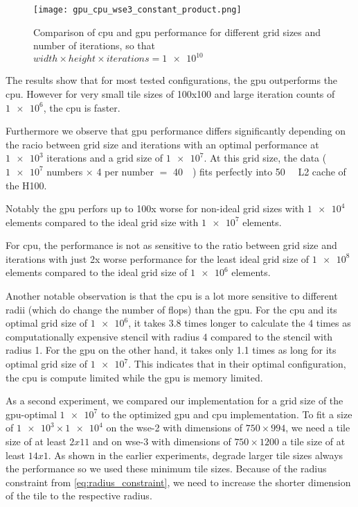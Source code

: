 \begin{figure}[h]
    \centering
    \texttt{[image: gpu\_cpu\_wse3\_constant\_product.png]}
    \caption{Comparison of \ac{cpu} and \ac{gpu} performance for different grid sizes and number of iterations, so that $width \times height \times iterations = \num{1e10}$}
    \label{fig:gpu_cpu_constant_product}
\end{figure}

The results show that for most tested configurations, the \ac{gpu} outperforms the \ac{cpu}.
However for very small tile sizes of 100x100 and large iteration counts of $\num{1e6}$, the \ac{cpu} is faster.

Furthermore we observe that \ac{gpu} performance differs significantly depending on the racio between grid size and iterations with an optimal performance at $\num{1e3}$ iterations and a grid size of $\num{1e7}$. At this grid size, the data ($\num{1e7}$ numbers $\times$ \qty{4}{\byte} per number $=$ \qty{40}{\mega\byte}) fits perfectly into \qty{50}{\mega\byte} L2 cache of the H100. 

Notably the \ac{gpu} perfors up to 100x worse for non-ideal grid sizes with $\num{1e4}$ elements compared to the ideal grid size with $\num{1e7}$ elements.

For \ac{cpu}, the performance is not as sensitive to the ratio between grid size and iterations with just 2x worse performance for the least ideal grid size of $\num{1e8}$ elements compared to the ideal grid size of $\num{1e6}$ elements.

Another notable observation is that the \ac{cpu} is a lot more sensitive to different radii (which do change the number of flops) than the \ac{gpu}. For the \ac{cpu} and its optimal grid size of $\num{1e6}$, it takes 3.8 times longer to calculate the 4 times as computationally expensive stencil with radius 4 compared to the stencil with radius 1. For the \ac{gpu} on the other hand, it takes only 1.1 times as long for its optimal grid size of $\num{1e7}$.
This indicates that in their optimal configuration, the \ac{cpu} is compute limited while the \ac{gpu} is memory limited.

As a second experiment, we compared our implementation for a grid size of the \ac{gpu}-optimal $\num{1e7}$ to the optimized \ac{gpu} and \ac{cpu} implementation. To fit a size of $\num{1e3}\times\num{1e4}$ on the \ac{wse}-2 with dimensions of $750\times994$, we need a tile size of at least $2x11$ and on \ac{wse}-3 with dimensions of $750\times1200$ a tile size of at least $14x1$. As shown in the earlier experiments, degrade larger tile sizes always the performance so we used these minimum tile sizes. Because of the radius constraint from \autoref{eq:radius_constraint}, we need to increase the shorter dimension of the tile to the respective radius.

